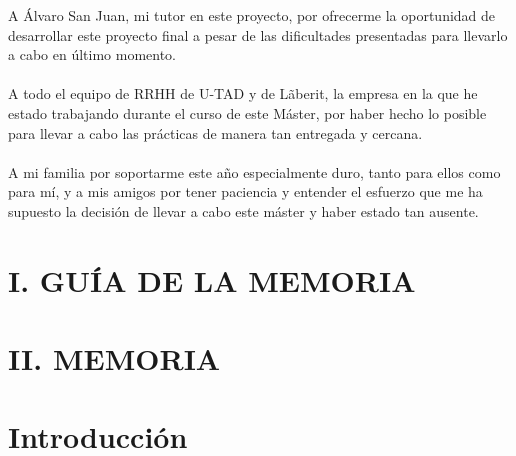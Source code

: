 \documentclass[book,spanish,a4paper,12pt]{tfg}
\begin{document}
\begin{agradecimientos}
  A Álvaro San Juan, mi tutor en este proyecto, por ofrecerme la oportunidad de desarrollar este proyecto final a pesar de las dificultades presentadas para llevarlo a cabo en último momento.\\
\\
  A todo el equipo de RRHH de U-TAD y de Lãberit, la empresa en la que he estado trabajando durante el curso de este Máster, por haber hecho lo posible para llevar a cabo las prácticas de manera tan entregada y cercana.\\
\\
  A mi familia por soportarme este año especialmente duro, tanto para ellos como para mí, y a mis amigos por tener paciencia y entender el esfuerzo que me ha supuesto la decisión de llevar a cabo este máster y haber estado tan ausente.\\

\end{agradecimientos}
\cleardoublepage

\tableofcontents

\pagestyle{tfg}
\justify




\renewcommand{\thechapter}{I} %

\chapter*{\centering I. GUÍA DE LA MEMORIA}


\chapter*{\centering II. MEMORIA}


\renewcommand{\thechapter}{\arabic{chapter}}

\chapter{Introducción}

\end{document}
